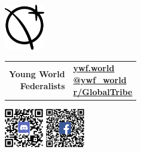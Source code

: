 \documentclass[11pt,a4paper]{article}
\begin{document}
\hline
\vspace{6px}
\begin{minipage}{0.2\textwidth}
   \centering
    \includegraphics[height=75px]{LOGO.eps}
\end{minipage}%
\begin{minipage}{0.45\textwidth}
\begin{shaded*}
\begin{tabularx}{0.5\textwidth}{r|X}
\makecell[r]{\LARGE{\textbf{Young World}}\\ \LARGE{\textbf{Federalists}}} & \makecell[l]{\textbf{\href{https://www.ywf.world}{ywf.world}} \\ \textbf{\href{https://twitter.com/ywf_world}{@ywf\_world}}\\  
\textbf{\href{https://www.reddit.com/r/GlobalTribe/}{r/GlobalTribe}}}
\end{tabularx}
\end{shaded*}
\end{minipage}%
\begin{minipage}{0.3\textwidth}
\centering
\includegraphics[height=64px]{qrcode-discord.eps} \includegraphics[height=64px]{qrcode-facebook.eps}

\end{minipage}%
\end{document}
